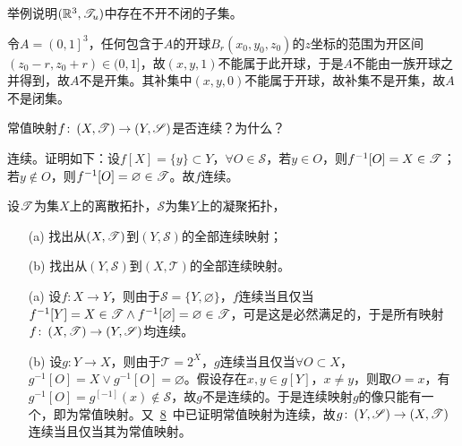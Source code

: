 \begin{xiti}
	\item 举例说明$(\mathbb{R}^3,\mathscr{T}_u)$中存在不开不闭的子集。
	
	\begin{jie}
		令$A=\left(0,1 \right]^3 $，任何包含于$A$的开球$B_{r}(x_0,y_0,z_0) $的$z$坐标的范围为开区间$(z_0-r,z_0+r)\in (0,1]$，故$(x,y,1)$不能属于此开球，于是$A$不能由一族开球之并得到，故$A$不是开集。其补集中$(x,y,0)$不能属于开球，故补集不是开集，故$A$不是闭集。
	\end{jie}
	
	\item \hypertarget{1.8}{} 常值映射$f\colon \left(X,\mathscr{T}\right)\rightarrow\left(Y,\mathscr{S}\right) $是否连续？为什么？
	
	\begin{jie}
		连续。证明如下：设$f[X]=\{y\}\subset Y$，$\forall O\in \mathscr{S} $，若$y\in O$，则$f^{-1}[O]=X\in \mathscr{T}$；若$y\notin O$，则$f^{-1}[O]=\varnothing \in\mathscr{T} $。故$f$连续。
	\end{jie}

	\item 设$\mathscr{T}$为集$X$上的离散拓扑，$\mathscr{S}$为集$Y$上的凝聚拓扑，
	\begin{enumerate}
		\item[(a)] 找出从$\left(X,\mathscr{T}\right)$到$\left(Y,\mathscr{S}\right)$的全部连续映射；
		\item[(b)] 找出从$\left(Y,\mathscr{S}\right)$到$\left(X,\mathscr{T}\right)$的全部连续映射。
	\end{enumerate}
	
	\begin{jie}
		\begin{enumerate}
			\item[(a)] 设$f\colon X\rightarrow Y$，则由于$\mathscr{S}=\{Y,\varnothing\}$，$f$连续当且仅当$f^{-1}[Y]=X\in \mathscr{T} \wedge f^{-1}[\varnothing]=\varnothing\in \mathscr{T}$，可是这是必然满足的，于是所有映射$f\colon \left(X,\mathscr{T}\right)\rightarrow\left(Y,\mathscr{S}\right) $均连续。
			\item[(b)] 设$g\colon Y\rightarrow X$，则由于$\mathscr{T}=2^X$，$g$连续当且仅当$\forall O\subset X $，$g^{-1}[O]=X \vee g^{-1}[O]=\varnothing $。假设存在$x,y\in g[Y]$，$x\neq y$，则取$O={x} $，有$g^{-1}[O]=g^[-1](x)\notin \mathscr{S} $，故$g$不是连续的。于是连续映射$g$的像只能有一个，即为常值映射。又~\hyperlink{1.8}{8}~中已证明常值映射为连续，故$g\colon \left(Y,\mathscr{S}\right)\rightarrow\left(X,\mathscr{T}\right) $连续当且仅当其为常值映射。
		\end{enumerate}
	\end{jie}
	

\end{xiti}
